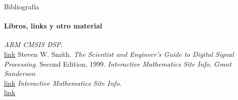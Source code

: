 \begin{frame}{Bibliografía}
   \framesubtitle{Libros, links y otro material}
   \begin{thebibliography}{9}
         \emph{ARM CMSIS DSP}. \\
         \href {https://arm-software.github.io/CMSIS_5/DSP/html/index.html}{link}
         Steven W. Smith.
         \emph{The Scientist and Engineer's Guide to Digital Signal Processing}.
         Second Edition, 1999.
         \emph{Interactive Mathematics Site Info}.
         \emph{Grant Sanderson} \\
         \href{ https://youtu.be/spUNpyF58BY}{link}
            \emph{Interactive Mathematics Site Info}. \\
            \href {https://www.intmath.com/fourier-series/fourier-intro.php}{link}
   \end{thebibliography}
\end{frame}

